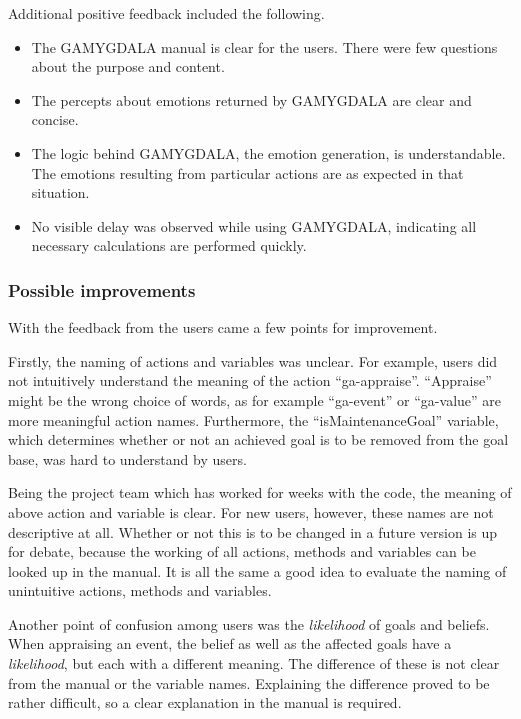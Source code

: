 \hspace{-\parindent}Additional positive feedback included the following.
\begin{itemize}
\item The GAMYGDALA manual is clear for the users. There were few questions about the purpose and content.
\item The percepts about emotions returned by GAMYGDALA are clear and concise. 
\item The logic behind GAMYGDALA, the emotion generation, is understandable. The emotions resulting from particular actions are as expected in that situation.
\item No visible delay was observed while using GAMYGDALA, indicating all necessary calculations are performed quickly.
\end{itemize}

\subsubsection{Possible improvements}
\label{subsubsec:iadposimprov}
With the feedback from the users came a few points for improvement.

Firstly, the naming of actions and variables was unclear. For example, users did not intuitively understand the meaning of the action ``ga-appraise''. ``Appraise'' might be the wrong choice of words, as for example ``ga-event'' or ``ga-value'' are more meaningful action names. Furthermore, the ``isMaintenanceGoal'' variable, which determines whether or not an achieved goal is to be removed from the goal base, was hard to understand by users.

Being the project team which has worked for weeks with the code, the meaning of above action and variable is clear. For new users, however, these names are not descriptive at all. Whether or not this is to be changed in a future version is up for debate, because the working of all actions, methods and variables can be looked up in the manual. It is all the same a good idea to evaluate the naming of unintuitive actions, methods and variables.

Another point of confusion among users was the \textit{likelihood} of goals and beliefs. When appraising an event, the belief as well as the affected goals have a \textit{likelihood}, but each with a different meaning. The difference of these is not clear from the manual or the variable names. Explaining the difference proved to be rather difficult, so a clear explanation in the manual is required.\\

